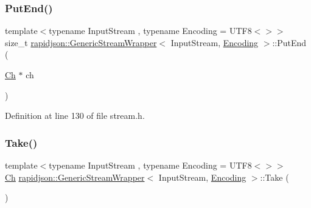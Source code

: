 \subsubsection{\texorpdfstring{PutEnd()}{PutEnd()}}
{\footnotesize\ttfamily template$<$typename Input\+Stream , typename Encoding  = U\+T\+F8$<$$>$$>$ \\
size\+\_\+t \mbox{\hyperlink{classrapidjson_1_1_generic_stream_wrapper}{rapidjson\+::\+Generic\+Stream\+Wrapper}}$<$ Input\+Stream, \mbox{\hyperlink{classrapidjson_1_1_encoding}{Encoding}} $>$\+::Put\+End (\begin{DoxyParamCaption}\item[{\mbox{\hyperlink{classrapidjson_1_1_generic_stream_wrapper_ac07ed61df8db2bd4a5e713e613b06bdb}{Ch}} $\ast$}]{ch }\end{DoxyParamCaption})}



Definition at line 130 of file stream.\+h.


\begin{DoxyCode}{0}

\end{DoxyCode}
\mbox{\label{classrapidjson_1_1_generic_stream_wrapper_a78083bbd93f63183f51b49d1cd0c445f}} 
\subsubsection{\texorpdfstring{Take()}{Take()}}
{\footnotesize\ttfamily template$<$typename Input\+Stream , typename Encoding  = U\+T\+F8$<$$>$$>$ \\
\mbox{\hyperlink{classrapidjson_1_1_generic_stream_wrapper_ac07ed61df8db2bd4a5e713e613b06bdb}{Ch}} \mbox{\hyperlink{classrapidjson_1_1_generic_stream_wrapper}{rapidjson\+::\+Generic\+Stream\+Wrapper}}$<$ Input\+Stream, \mbox{\hyperlink{classrapidjson_1_1_encoding}{Encoding}} $>$\+::Take (\begin{DoxyParamCaption}{ }\end{DoxyParamCaption})}



